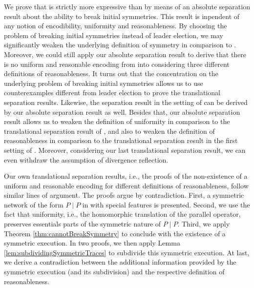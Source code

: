 \documentclass[11pt,techReport]{eptcs}
\begin{document}
We prove that \pimix is strictly more expressive than \pisep by means of an absolute separation result about the ability to break initial symmetries. This result is inpendent of any notion of encodibility, uniformity and reasonableness. By choosing the problem of breaking initial symmetries instead of leader election, we may significantly weaken the underlying definition of symmetry in comparison to \cite{palamidessi03}.  Moreover, we could still apply our absolute separation result to derive that there is no uniform and reasonable encoding from \pimix into \pisep considering three different definitions of reasonableness.  It turns out that the concentration on the underlying problem of breaking initial symmetries allows us to use counterexamples different from leader election to prove the translational separation results. Likewise, the separation result in the setting of \cite{gorla08d} can be derived by our absolute separation result as well. Besides that, our absolute separation result allows us to weaken the definition of uniformity in comparison to the translational separation result of \cite{palamidessi03}, and also to weaken the definition of reasonableness in comparison to the translational separation result in the first setting of \cite{gorla08d}.  Moreover, considering our last translational separation result, we can even withdraw the assumption of divergence reflection.

Our own translational separation results, i.e., the proofs of the non-existence of a uniform and reasonable encoding for different definitions of reasonableness, follow similar lines of argument. The proofs argue by contradiction. First, a symmetric network of the form $ P \mid P $ in \procmix with special features is presented.  Second, we use the fact that uniformity, i.e., the homomorphic translation of the parallel operator, preserves essentials parts of the symmetric nature of $ P \mid P $.  Third, we apply Theorem \ref{thm:cannotBreakSymmetry} to conclude with the existence of a symmetric execution. In two proofs, we then apply Lemma \ref{lem:subdividingSymmetricTraces} to subdivide this symmetric execution. At last, we derive a contradiction between the additional information provided by the symmetric execution (and its subdivision) and the respective definition of reasonableness.
\end{document}
